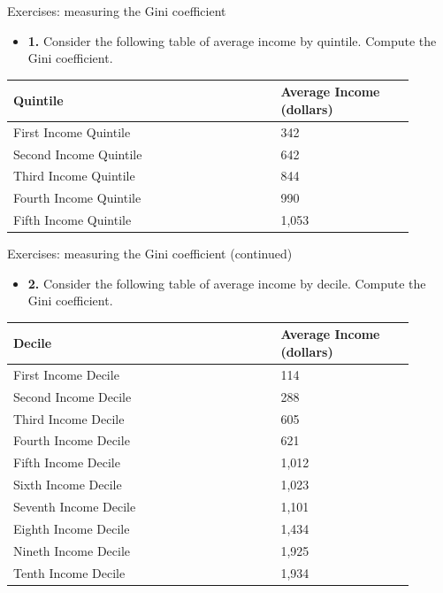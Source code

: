 \documentclass[aspectratio=169]{beamer}
\begin{document}
\begin{frame}{Exercises: measuring the Gini coefficient}
\transfade
\begin{itemize}[<+->]
\item \textbf{1.} Consider the following table of average income by quintile. Compute the Gini coefficient.
\end{itemize}
\begin{center}
\small
\begin{tabular}{p{0.60\linewidth} p{0.30\linewidth}}
\toprule
\textbf{Quintile} & \textbf{Average Income (dollars)} \\
\midrule
First Income Quintile & 342 \\
Second Income Quintile & 642 \\
Third Income Quintile & 844 \\
Fourth Income Quintile & 990 \\
Fifth Income Quintile & 1{,}053 \\
\bottomrule
\end{tabular}
\end{center}
\end{frame}

\begin{frame}{Exercises: measuring the Gini coefficient (continued)}
\transfade
\begin{itemize}[<+->]
\item \textbf{2.} Consider the following table of average income by decile. Compute the Gini coefficient.
\end{itemize}
\begin{center}
\small
\begin{tabular}{p{0.60\linewidth} p{0.30\linewidth}}
\toprule
\textbf{Decile} & \textbf{Average Income (dollars)} \\
\midrule
First Income Decile & 114 \\
Second Income Decile & 288 \\
Third Income Decile & 605 \\
Fourth Income Decile & 621 \\
Fifth Income Decile & 1{,}012 \\
Sixth Income Decile & 1{,}023 \\
Seventh Income Decile & 1{,}101 \\
Eighth Income Decile & 1{,}434 \\
Nineth Income Decile & 1{,}925 \\
Tenth Income Decile & 1{,}934 \\
\bottomrule
\end{tabular}
\end{center}
\end{frame}
\end{document}
